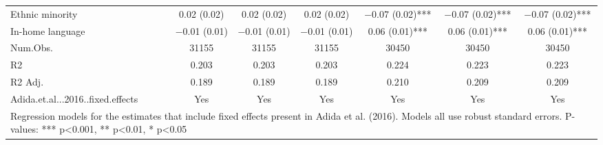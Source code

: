 \begin{table}[H]
\begin{tabular}[t]{lcccccc}
Ethnic minority & \num{0.02} (\num{0.02}) & \num{0.02} (\num{0.02}) & \num{0.02} (\num{0.02}) & \num{-0.07} (\num{0.02})*** & \num{-0.07} (\num{0.02})*** & \num{-0.07} (\num{0.02})***\\
In-home language & \num{-0.01} (\num{0.01}) & \num{-0.01} (\num{0.01}) & \num{-0.01} (\num{0.01}) & \num{0.06} (\num{0.01})*** & \num{0.06} (\num{0.01})*** & \num{0.06} (\num{0.01})***\\
\midrule
Num.Obs. & \num{31155} & \num{31155} & \num{31155} & \num{30450} & \num{30450} & \num{30450}\\
R2 & \num{0.203} & \num{0.203} & \num{0.203} & \num{0.224} & \num{0.223} & \num{0.223}\\
R2 Adj. & \num{0.189} & \num{0.189} & \num{0.189} & \num{0.210} & \num{0.209} & \num{0.209}\\
Adida.et.al...2016..fixed.effects & Yes & Yes & Yes & Yes & Yes & Yes\\
\bottomrule
\multicolumn{7}{l}{\rule{0pt}{1em}Regression models for the estimates that include fixed effects present in Adida et al. (2016). Models all use robust standard errors. P-values: *** p<0.001, ** p<0.01, * p<0.05}\\
\end{tabular}
\end{table}
